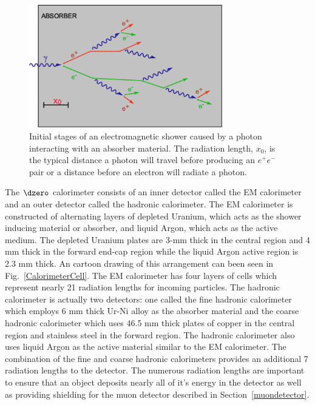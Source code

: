 \begin{figure}[!h!tbp]
\begin{center}
\includegraphics[width=0.75\textwidth]{eps/D0/shower.eps}
\end{center}
\vspace{-0.1in}
\caption{Initial stages of an electromagnetic shower caused by a photon interacting with an absorber material. The radiation length, $x_{0}$, is the typical distance a photon will travel before producing an $e^{+}e^{-}$ pair or a distance before an electron will radiate a photon.}
\label{EMshower}
\end{figure}

The $\dzero$ calorimeter consists of an inner detector called the EM calorimeter and an outer detector called the hadronic calorimeter. The EM calorimeter is constructed of alternating layers of depleted Uranium, which acts as the shower inducing material or absorber, and liquid Argon, which acts as the active medium. The depleted Uranium plates are 3-mm thick in the central region and 4 mm thick in the forward end-cap region while the liquid Argon active region is 2.3 mm thick. An cartoon drawing of this arrangement can been seen in Fig.~\ref{CalorimeterCell}. The EM calorimeter has four layers of cells which represent nearly 21 radiation lengths for incoming particles. The hadronic calorimeter is actually two detectors: one called the fine hadronic calorimeter which employs 6 mm thick Ur-Ni alloy as the absorber material and the coarse hadronic calorimeter which uses 46.5 mm thick plates of copper in the central region and stainless steel in the forward region. The hadronic calorimeter also uses liquid Argon as the active material similar to the EM calorimeter. The combination of the fine and coarse hadronic calorimeters provides an additional 7 radiation lengths to the detector. The numerous radiation lengths are important to ensure that an object deposits nearly all of it's energy in the detector as well as providing shielding for the muon detector described in Section~\ref{muondetector}.


